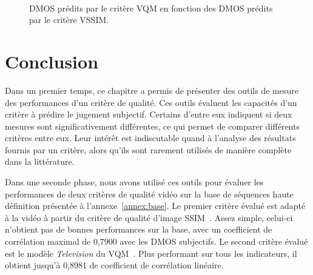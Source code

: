 \begin{figure}[htbp]
	\centering
	\hfill
	\\
  \caption{DMOS prédits par le critère VQM en fonction des DMOS prédits par le critère VSSIM.}
\end{figure}


\section{Conclusion}
Dans un premier temps, ce chapitre a permis de présenter des outils de mesure des performances d'un critère de qualité. Ces outils évaluent les capacités d'un critère à prédire le jugement subjectif. Certains d'entre eux indiquent si deux mesures sont significativement différentes, ce qui permet de comparer différents critères entre eux. Leur intérêt est indiscutable quand à l'analyse des résultats fournis par un critère, alors qu'ils sont rarement utilisés de manière complète dans la littérature.

Dans une seconde phase, nous avons utilisé ces outils pour évaluer les performances de deux critères de qualité vidéo sur la base de séquences haute définition présentée à l'annexe~\ref{annex:base}. Le premier critère évalué est adapté à la vidéo à partir du critère de qualité d'image SSIM~\cite{wang-vqasdm}. Assez simple, celui-ci n'obtient pas de bonnes performances sur la base, avec un coefficient de corrélation maximal de 0,7900 avec les DMOS subjectifs. Le second critère évalué est le modèle \emph{Television} du VQM~\cite{wolf-vqmtech}. Plus performant sur tous les indicateurs, il obtient jusqu'à 0,8981 de coefficient de corrélation linéaire.

